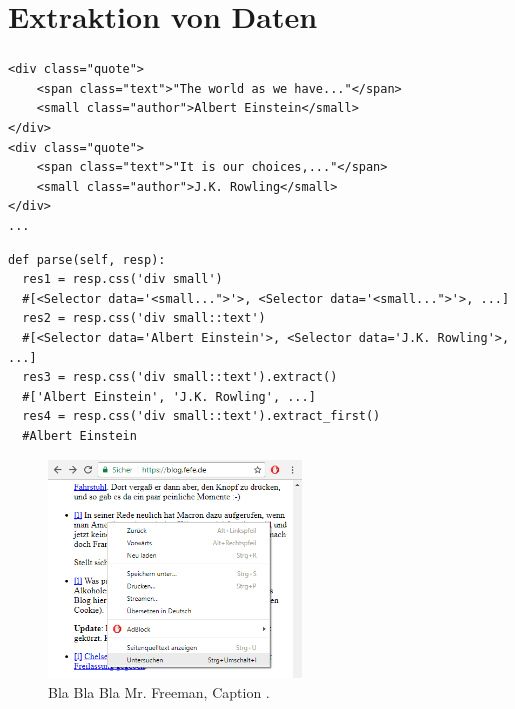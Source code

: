 \documentclass{beamer}
\begin{document}
\section{Extraktion von Daten}
\begin{frame}
	\frametitle{\insertsection{}}
	\begin{lstlisting}[basicstyle=\footnotesize]
<div class="quote">
    <span class="text">"The world as we have..."</span>
    <small class="author">Albert Einstein</small>
</div>
<div class="quote">
    <span class="text">"It is our choices,..."</span>
    <small class="author">J.K. Rowling</small>
</div>
...
	\end{lstlisting}
	\begin{lstlisting}[breaklines=true,basicstyle=\footnotesize]
def parse(self, resp):
  res1 = resp.css('div small')
  #[<Selector data='<small...">'>, <Selector data='<small...">'>, ...]
  res2 = resp.css('div small::text')
  #[<Selector data='Albert Einstein'>, <Selector data='J.K. Rowling'>, ...]
  res3 = resp.css('div small::text').extract()
  #['Albert Einstein', 'J.K. Rowling', ...]
  res4 = resp.css('div small::text').extract_first()
  #Albert Einstein
	\end{lstlisting}
	
	\framebreak
	
	
	\begin{figure}
		\begin{center}
			\includegraphics[width=0.6\textwidth]{texsrc/HTML_inspect_A}
		\end{center}
		\vspace{-10pt}
		\caption{Bla Bla Bla Mr. Freeman, Caption .} 
		\label{fig:HTML_Inspect_selection}
	\end{figure}
	

\end{frame}
\end{document}
